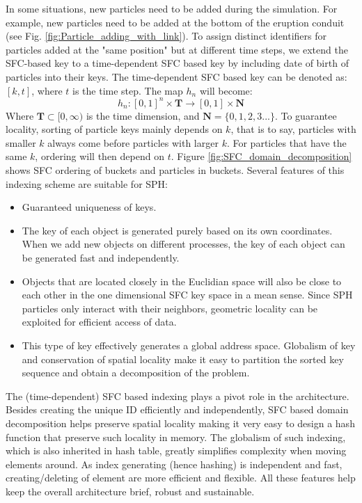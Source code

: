 In some situations, new particles need to be added during the simulation. For example, new particles need to be added at the bottom of the eruption conduit (see Fig. \ref{fig:Particle_adding_with_link}). To assign distinct identifiers for particles added at the "same position" but at different time steps, we extend the SFC-based key to a time-dependent SFC based key by including date of birth of particles into their keys. The time-dependent SFC based key can be denoted as: $[k,t]$, where $t$ is the time step. The map $h_n$ will become:
\begin{equation}
h_n: [0,1]^n \times \textbf{T} \rightarrow [0,1] \times \textbf{N}
\end{equation}
Where $\textbf{T} \subset [0,\infty)$ is the time dimension, and $\textbf{N}=\lbrace 0, 1, 2, 3...\rbrace$.
To guarantee locality, sorting of particle keys mainly depends on $k$, that is to say, particles with smaller $k$ always come before particles with larger $k$. For particles that have the same $k$, ordering will then depend on $t$. Figure \ref{fig:SFC_domain_decomposition} shows SFC ordering of buckets and particles in buckets. 
Several features of this indexing scheme are suitable for SPH:
\begin{itemize}
\item Guaranteed uniqueness of keys.
\item The key of each object is generated purely based on its own coordinates. When we add new objects on different processes, the key of each object can be generated fast and independently.
\item Objects that are located closely in the Euclidian space will also be close to each other in the one dimensional SFC key space in a mean sense. Since SPH particles only interact with their neighbors, geometric locality can be exploited for efficient access of data.
\item This type of key effectively generates a global address space. Globalism of key and conservation of spatial locality make it easy to partition the sorted key sequence and obtain a decomposition of the problem.
\end{itemize}

The (time-dependent) SFC based indexing plays a pivot role in the architecture. Besides creating the unique ID efficiently and independently, SFC based domain decomposition helps preserve spatial locality making it very easy to design a hash function that preserve such locality in memory. The globalism of such indexing, which is also inherited in hash table, greatly simplifies complexity when moving elements around. As index generating (hence hashing) is independent and fast, creating/deleting of element are more efficient and flexible.
All these features help keep the overall architecture brief, robust and sustainable.

